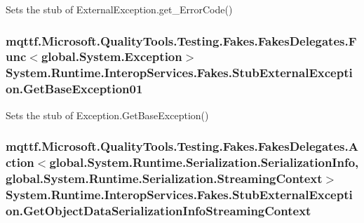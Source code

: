 Sets the stub of External\-Exception.\-get\-\_\-\-Error\-Code()

\hypertarget{class_system_1_1_runtime_1_1_interop_services_1_1_fakes_1_1_stub_external_exception_a334e9f2fbbeba0c732e42dd2bf3e0a8d}{
\subsubsection[{Get\-Base\-Exception01}]{\setlength{\rightskip}{0pt plus 5cm}mqttf.\-Microsoft.\-Quality\-Tools.\-Testing.\-Fakes.\-Fakes\-Delegates.\-Func$<$global.\-System.\-Exception$>$ System.\-Runtime.\-Interop\-Services.\-Fakes.\-Stub\-External\-Exception.\-Get\-Base\-Exception01}}\label{class_system_1_1_runtime_1_1_interop_services_1_1_fakes_1_1_stub_external_exception_a334e9f2fbbeba0c732e42dd2bf3e0a8d}


Sets the stub of Exception.\-Get\-Base\-Exception()

\hypertarget{class_system_1_1_runtime_1_1_interop_services_1_1_fakes_1_1_stub_external_exception_aa513357440ef968c327afd56a31f0e9c}{
\subsubsection[{Get\-Object\-Data\-Serialization\-Info\-Streaming\-Context}]{\setlength{\rightskip}{0pt plus 5cm}mqttf.\-Microsoft.\-Quality\-Tools.\-Testing.\-Fakes.\-Fakes\-Delegates.\-Action$<$global.\-System.\-Runtime.\-Serialization.\-Serialization\-Info, global.\-System.\-Runtime.\-Serialization.\-Streaming\-Context$>$ System.\-Runtime.\-Interop\-Services.\-Fakes.\-Stub\-External\-Exception.\-Get\-Object\-Data\-Serialization\-Info\-Streaming\-Context}}\label{class_system_1_1_runtime_1_1_interop_services_1_1_fakes_1_1_stub_external_exception_aa513357440ef968c327afd56a31f0e9c}


